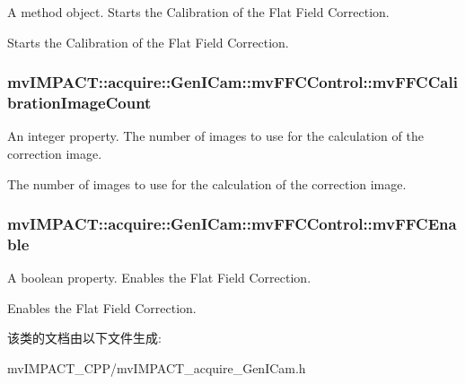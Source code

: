 A method object. Starts the Calibration of the Flat Field Correction. 

Starts the Calibration of the Flat Field Correction. \hypertarget{classmv_i_m_p_a_c_t_1_1acquire_1_1_gen_i_cam_1_1mv_f_f_c_control_af6d11f50a9987c5303433a0602d4fd7e}{
\subsubsection[{mv\+F\+F\+C\+Calibration\+Image\+Count}]{ mv\+I\+M\+P\+A\+C\+T\+::acquire\+::\+Gen\+I\+Cam\+::mv\+F\+F\+C\+Control\+::mv\+F\+F\+C\+Calibration\+Image\+Count}}\label{classmv_i_m_p_a_c_t_1_1acquire_1_1_gen_i_cam_1_1mv_f_f_c_control_af6d11f50a9987c5303433a0602d4fd7e}


An integer property. The number of images to use for the calculation of the correction image. 

The number of images to use for the calculation of the correction image. \hypertarget{classmv_i_m_p_a_c_t_1_1acquire_1_1_gen_i_cam_1_1mv_f_f_c_control_af8c4a2cfcdb4cf53fd423a28d19193f9}{
\subsubsection[{mv\+F\+F\+C\+Enable}]{ mv\+I\+M\+P\+A\+C\+T\+::acquire\+::\+Gen\+I\+Cam\+::mv\+F\+F\+C\+Control\+::mv\+F\+F\+C\+Enable}}\label{classmv_i_m_p_a_c_t_1_1acquire_1_1_gen_i_cam_1_1mv_f_f_c_control_af8c4a2cfcdb4cf53fd423a28d19193f9}


A boolean property. Enables the Flat Field Correction. 

Enables the Flat Field Correction. 

该类的文档由以下文件生成\+:\begin{DoxyCompactItemize}
\item 
mv\+I\+M\+P\+A\+C\+T\+\_\+\+C\+P\+P/mv\+I\+M\+P\+A\+C\+T\+\_\+acquire\+\_\+\+Gen\+I\+Cam.\+h\end{DoxyCompactItemize}
